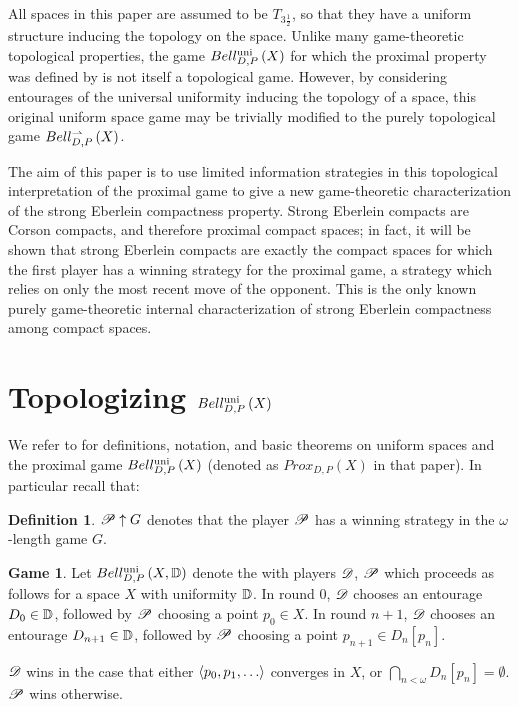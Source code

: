 \documentclass{amsart}
\theoremstyle{definition}
\newtheorem{definition}[theorem]{Definition}
\newtheorem{game}[theorem]{Game}
\begin{document}
  All spaces in this paper are assumed to be \(T_{3\frac{1}{2}}\), so that they
  have a uniform structure inducing the topology on the space.
  Unlike many game-theoretic topological properties, the game
  \(Bell_{D,P}^{\textrm{uni}}\left({X}\right)\)
  for which the proximal property was defined by is not itself a topological
  game. However, by considering entourages of the universal uniformity
  inducing the topology of a space, this original uniform space game may be
  trivially modified to the purely topological game \(Bell_{D,P}^{\rightharpoonup}\left({X}\right)\).

  The aim of this paper is to use limited information strategies in
  this topological interpretation of the
  proximal game to give a new game-theoretic characterization of the
  strong Eberlein compactness property. Strong Eberlein compacts are Corson
  compacts, and therefore proximal compact spaces; in fact, it will be shown
  that strong Eberlein compacts are exactly the compact spaces for which the
  first player has a  winning strategy for the proximal game,
  a strategy which relies on only the most recent move of the opponent.
  This is the only known purely game-theoretic internal characterization of
  strong Eberlein compactness among compact spaces.


\section{Topologizing \(Bell_{D,P}^{\textrm{uni}}\left({X}\right)\)}

  We refer to \cite{MR3227201} for definitions, notation, and basic theorems on
  uniform spaces and the proximal game \(Bell_{D,P}^{\textrm{uni}}\left({X}\right)\) (denoted as
  \(Prox_{D,P}(X)\) in that paper). In particular recall that:

  \begin{definition}
    \(\mathscr{P} \uparrow G\) denotes that the player \(\mathscr{P}\) has a winning strategy
    in the \(\omega\)-length game \(G\).
  \end{definition}

  \begin{game}
    Let \(Bell_{D,P}^{\textrm{uni}}\left({X,\mathbb{D}}\right)\) denote the
     with
    players \(\mathscr{D}\), \(\mathscr{P}\) which proceeds as follows for
    a space \(X\) with uniformity \(\mathbb{D}\). In round \(0\),
    \(\mathscr{D}\) chooses an entourage \(D_0\in\mathbb{D}\), followed by \(\mathscr{P}\)
    choosing a point \(p_0\in X\). In round \(n+1\),
    \(\mathscr{D}\) chooses an entourage
    \(D_{n+1}\in\mathbb{D}\),
    followed by \(\mathscr{P}\) choosing a point \(p_{n+1}\in D_n[p_n]\).

    \(\mathscr{D}\) wins in the case that either
    \(\<p_0,p_1,\dots\>\) converges in \(X\),
    or \(\bigcap_{n<\omega}D_n[p_n] = \emptyset\). \(\mathscr{P}\) wins otherwise.
  \end{game}
\end{document}
